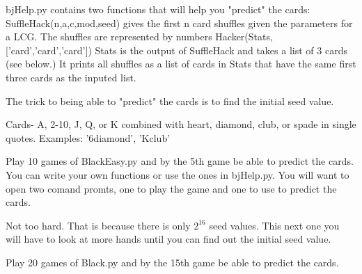 bjHelp.py contains two functions that will help you "predict" the cards:
SuffleHack(n,a,c,mod,seed) gives the first n card shuffles given the parameters for a LCG. The shuffles are represented by numbers 
Hacker(Stats,['card','card','card']) Stats is the output of SuffleHack and takes a list of 3 cards (see below.) It prints all shuffles as a list of cards in Stats that have the same first three cards as the inputed list.

The trick to being able to "predict" the cards is to find the initial seed value.

Cards- A, 2-10, J, Q, or K combined with heart, diamond, club, or spade in single quotes. Examples: '6diamond', 'Kclub'



\begin{problem}
Play 10 games of BlackEasy.py and by the 5th game be able to predict the cards. You can write your own functions or use the ones in bjHelp.py. You will want to open two comand promts, one to play the game and one to use to predict the cards. 
\end{problem}

Not too hard. That is because there is only $2^{16}$ seed values. This next one you will have to look at more hands until you can find out the initial seed value.

\begin{problem}
Play 20 games of Black.py and by the 15th game be able to predict the cards.
\end{problem}



